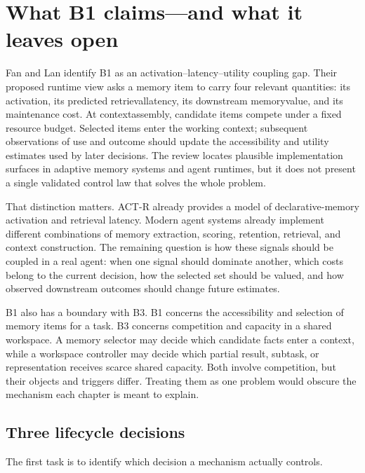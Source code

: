 \section{What B1 claims—and what it leaves open}
\label{sec:ch12-b1}

Fan and Lan identify B1 as an activation--latency--utility coupling gap. Their proposed runtime view asks a memory item to carry four relevant quantities: its activation, its predicted \gls{retrievallatency}, its downstream \gls{memoryvalue}, and its maintenance cost. At \gls{contextassembly}, candidate items compete under a fixed resource budget. Selected items enter the working context; subsequent observations of use and outcome should update the accessibility and utility estimates used by later decisions. The review locates plausible implementation surfaces in adaptive memory systems and agent runtimes, but it does not present a single validated control law that solves the whole problem.

That distinction matters. ACT-R already provides a model of declarative-memory activation and retrieval latency. Modern agent systems already implement different combinations of memory extraction, scoring, retention, retrieval, and context construction. The remaining question is how these signals should be coupled in a real agent: when one signal should dominate another, which costs belong to the current decision, how the selected set should be valued, and how observed downstream outcomes should change future estimates.

B1 also has a boundary with B3. B1 concerns the accessibility and selection of memory items for a task. B3 concerns competition and capacity in a shared workspace. A memory selector may decide which candidate facts enter a context, while a workspace controller may decide which partial result, subtask, or representation receives scarce shared capacity. Both involve competition, but their objects and triggers differ. Treating them as one problem would obscure the mechanism each chapter is meant to explain.

\subsection{Three lifecycle decisions}
\label{subsec:ch12-three-decisions}

The first task is to identify which decision a mechanism actually controls.

